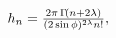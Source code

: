 $h_{n}=\frac{2\pi\mathop{\Gamma\/}\nolimits\!\left(n+2\lambda\right)}{(2\mathop%
{\sin\/}\nolimits\phi)^{2\lambda}n!},$